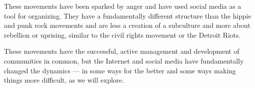 These movements have been sparked by anger and have used social media as a tool for organizing. They have a fundamentally different structure than the hippie and punk rock movements and are less a creation of a subculture and more about rebellion or uprising, similar to the civil rights movement or the Detroit Riots.

These movements have the successful, active management and development of communities in common, but the Internet and social media have fundamentally changed the dynamics --- in some ways for the better and some ways making things more difficult, as we will explore.